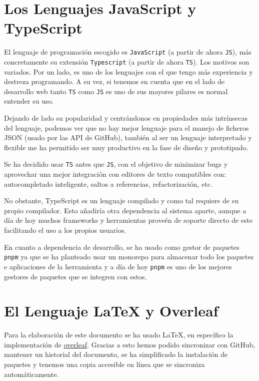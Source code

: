 \section{Los Lenguajes JavaScript y TypeScript}
El lenguaje de programación escogido es \verb|JavaScript|\cite{js} (a partir de ahora \verb|JS|), más concretamente su extensión \verb|Typescript|\cite{ts} (a partir de ahora \verb|TS|). Los motivos son variados. Por un lado, es uno de los lenguajes con el que tengo más experiencia y destreza programando. A su vez, si tenemos en cuenta que en el lado de desarrollo web tanto \verb|TS|\cite{ts} como \verb|JS|\cite{js} es uno de sus mayores pilares es normal entender su uso.

Dejando de lado su popularidad y centrándonos en propiedades más intrínsecas del lenguaje, podemos ver que no hay mejor lenguaje para el manejo de ficheros JSON (usado por las API de GitHub), también al ser un lenguaje interpretado y flexible me ha permitido ser muy productivo en la fase de diseño y prototipado.

Se ha decidido usar \verb|TS| \cite{ts} antes que \verb|JS|\cite{js}, con el objetivo de minimizar bugs y aprovechar una mejor integración con editores de texto compatibles con: autocompletado inteligente, saltos a referencias, refactorización, etc.

No obstante, TypeScript es un lenguaje compilado y como tal requiere de su propio compilador. 
Esto añadiría otra dependencia al sistema aparte, aunque a día de hoy muchos frameworks y herramientas proveén de soporte directo de este facilitando el uso a los propios usuarios. 

En cuanto a dependencia de desarrollo, se ha usado como gestor de paquetes \verb|pnpm|\cite{pnpm} ya que se ha planteado usar un monorepo para almacenar todo los paquetes e aplicaciones de la herramienta y a día de hoy  \verb|pnpm|\cite{pnpm} es uno de los mejores gestores de paquetes que se integren con estos.

\section{El Lenguaje \LaTeX{} y Overleaf}
Para la elaboración de este documento se ha usado \LaTeX{}, 
en específico la implementación de \href{https://www.overleaf.com/}{overleaf}\cite{overlife}.
Gracias a esto hemos podido sincronizar con GitHub,
mantener un historial del documento, 
se ha simplificado la instalación de paquetes  y 
tenemos una copia accesible en línea que se sincroniza automáticamente.

